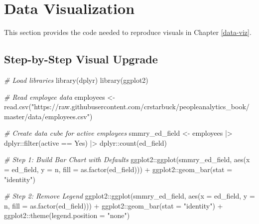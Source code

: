 \documentclass[
]{book}
\newenvironment{Shaded}{\begin{snugshade}}{\end{snugshade}}
\newcommand{\AttributeTok}[1]{\textcolor[rgb]{0.77,0.63,0.00}{#1}}
\newcommand{\CommentTok}[1]{\textcolor[rgb]{0.56,0.35,0.01}{\textit{#1}}}
\newcommand{\FunctionTok}[1]{\textcolor[rgb]{0.00,0.00,0.00}{#1}}
\newcommand{\NormalTok}[1]{#1}
\newcommand{\OtherTok}[1]{\textcolor[rgb]{0.56,0.35,0.01}{#1}}
\newcommand{\SpecialCharTok}[1]{\textcolor[rgb]{0.00,0.00,0.00}{#1}}
\newcommand{\StringTok}[1]{\textcolor[rgb]{0.31,0.60,0.02}{#1}}
\begin{document}
\hypertarget{data-visualization}{%
\section{Data Visualization}\label{data-visualization}}

This section provides the code needed to reproduce visuals in Chapter \ref{data-viz}.

\hypertarget{step-by-step-visual-upgrade-1}{%
\subsection{Step-by-Step Visual Upgrade}\label{step-by-step-visual-upgrade-1}}

\begin{Shaded}
\begin{Highlighting}[]
\CommentTok{\# Load libraries}
\FunctionTok{library}\NormalTok{(dplyr)}
\FunctionTok{library}\NormalTok{(ggplot2)}

\CommentTok{\# Read employee data}
\NormalTok{employees }\OtherTok{\textless{}{-}} \FunctionTok{read.csv}\NormalTok{(}\StringTok{"https://raw.githubusercontent.com/crstarbuck/peopleanalytics\_book/master/data/employees.csv"}\NormalTok{)}

\CommentTok{\# Create data cube for active employees}
\NormalTok{smmry\_ed\_field }\OtherTok{\textless{}{-}}\NormalTok{ employees }\SpecialCharTok{|\textgreater{}}
\NormalTok{                  dplyr}\SpecialCharTok{::}\FunctionTok{filter}\NormalTok{(active }\SpecialCharTok{==} \StringTok{\textquotesingle{}Yes\textquotesingle{}}\NormalTok{) }\SpecialCharTok{|\textgreater{}}
\NormalTok{                  dplyr}\SpecialCharTok{::}\FunctionTok{count}\NormalTok{(ed\_field)}

\CommentTok{\# Step 1: Build Bar Chart with Defaults}
\NormalTok{ggplot2}\SpecialCharTok{::}\FunctionTok{ggplot}\NormalTok{(smmry\_ed\_field, }\FunctionTok{aes}\NormalTok{(}\AttributeTok{x =}\NormalTok{ ed\_field, }\AttributeTok{y =}\NormalTok{ n, }\AttributeTok{fill =} \FunctionTok{as.factor}\NormalTok{(ed\_field))) }\SpecialCharTok{+}
\NormalTok{ggplot2}\SpecialCharTok{::}\FunctionTok{geom\_bar}\NormalTok{(}\AttributeTok{stat =} \StringTok{"identity"}\NormalTok{) }

\CommentTok{\# Step 2: Remove Legend}
\NormalTok{ggplot2}\SpecialCharTok{::}\FunctionTok{ggplot}\NormalTok{(smmry\_ed\_field, }\FunctionTok{aes}\NormalTok{(}\AttributeTok{x =}\NormalTok{ ed\_field, }\AttributeTok{y =}\NormalTok{ n, }\AttributeTok{fill =} \FunctionTok{as.factor}\NormalTok{(ed\_field))) }\SpecialCharTok{+}
\NormalTok{ggplot2}\SpecialCharTok{::}\FunctionTok{geom\_bar}\NormalTok{(}\AttributeTok{stat =} \StringTok{"identity"}\NormalTok{) }\SpecialCharTok{+}
\NormalTok{ggplot2}\SpecialCharTok{::}\FunctionTok{theme}\NormalTok{(}\AttributeTok{legend.position =} \StringTok{"none"}\NormalTok{)}


\end{Highlighting}
\end{Shaded}
\end{document}
